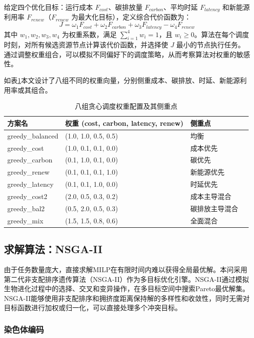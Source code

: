 \documentclass[UTF8,a4paper,zihao=-4]{ctexart}
\begin{document}
给定四个优化目标：运行成本 \({F}_{cost}\)、碳排放量 \({F}_{carbon}\)、平均时延 \({F}_{latency}\) 和新能源利用率 \({F}_{renew}\)（\({F}_{renew}\) 为最大化目标），定义综合代价函数为：
$$
 J= \omega_1 {F}_{cost} + \omega_2 {F}_{carbon} + \omega_3 {F}_{latency} - \omega_4 {F}_{renew}
$$
其中 \(w_1, w_2, w_3, w_4\) 为权重系数，满足 \(\sum_{i=1}^4 w_i = 1\)，且 \(w_i \ge 0\)。算法在每个调度时刻，对所有候选资源节点计算该代价函数，并选择使 \(J\) 最小的节点执行任务。通过调整权重组合，可以模拟不同偏好下的调度策略，从而考察算法对权重的敏感性。

如表\ref{tab:greedy_weights}本文设计了八组不同的权重向量，分别侧重成本、碳排放、时延、新能源利用率或其组合。
\begin{table}[htbp]
\centering
\small
\caption{八组贪心调度权重配置及其侧重点}
\label{tab:greedy_weights}
\begin{tabular}{llll}
\toprule
\textbf{方案名} & \textbf{权重 (cost, carbon, latency, renew)} & \textbf{侧重点} \\
\midrule
greedy\_balanced & (1.0, 1.0, 0.5, 0.5) & 均衡 \\
greedy\_cost     & (1.0, 0.1, 0.1, 0.0) & 成本优先 \\
greedy\_carbon   & (0.1, 1.0, 0.1, 0.0) & 碳优先 \\
greedy\_renew    & (0.1, 0.1, 0.1, 1.0) & 新能源优先 \\
greedy\_latency  & (0.1, 0.1, 1.0, 0.0) & 时延优先 \\
greedy\_cost2    & (2.0, 0.5, 0.3, 0.2) & 成本主导混合 \\
greedy\_bal2     & (0.5, 2.0, 0.5, 0.3) & 碳排放主导混合 \\
greedy\_mix      & (1.5, 1.5, 0.8, 0.6) & 全面混合 \\
\bottomrule
\end{tabular}
\end{table}
\subsection{求解算法：NSGA-II}

由于任务数量庞大，直接求解MILP在有限时间内难以获得全局最优解。本问采用第二代非支配排序遗传算法（NSGA-II）作为多目标优化引擎\cite{deb2002nsga,公茂果2009进化多目标}。NSGA-II通过模拟生物进化过程中的选择、交叉和变异操作，在多目标空间中搜索Pareto最优解集。NSGA-II能够使用非支配排序和拥挤度距离保持解的多样性和收敛性，同时无需对目标函数进行加权或归一化，可以直接处理多个冲突目标。

\subsubsection{染色体编码}
\end{document}

